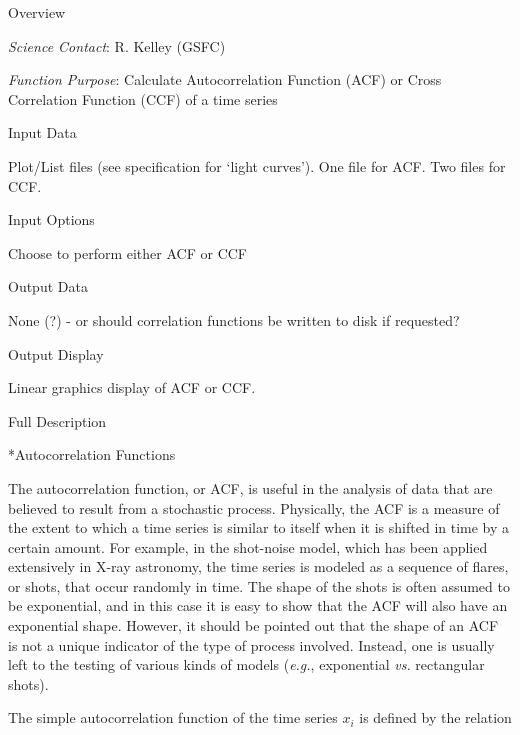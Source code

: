 %
\def\version{\it Rev. 1.0 --- 3/31/86}
\def\chapter{\it Timing Analysis: Correlation analysis}

\@{Overview}

\noindent
{\it Science Contact}:  R. Kelley (GSFC)

\noindent
{\it Function Purpose}: Calculate Autocorrelation Function (ACF) or
Cross Correlation Function (CCF) of a time series

\@{Input Data}

\item{}Plot/List files (see specification for `light curves').  One
file for ACF. Two files for CCF.

\@{Input Options}

\item{}Choose to perform either ACF or CCF

\@{Output Data}

\item{}None (?) - or should correlation functions be written to disk if requested?

\@{Output Display}

\item{}Linear graphics display of ACF or CCF.


\@{Full Description}

\**Autocorrelation Functions

{\list

The autocorrelation function, or ACF, is useful in the analysis of data that
are believed to result from a stochastic process.  Physically, the ACF is
a measure of the extent to which a time series is similar to itself when it is
shifted in time by a certain amount.  For example, in the shot-noise model,
which has been applied extensively in X-ray astronomy, the time series is
modeled as a sequence of flares, or shots, that occur randomly in time.  The
shape of the shots is often assumed to be exponential, and in this case it is
easy to show that the ACF will also have an exponential shape.  However, it
should be pointed out that the shape of an ACF is not a unique indicator of
the type of process involved.  Instead, one is usually left to the testing of
various kinds of models ({\it e.g.}, exponential {\it vs.} rectangular shots).

The simple autocorrelation function of the time series $x_i$ is defined by
the relation

}

